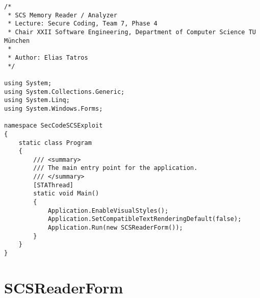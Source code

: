 \begin{lstlisting}
/* 
 * SCS Memory Reader / Analyzer
 * Lecture: Secure Coding, Team 7, Phase 4
 * Chair XXII Software Engineering, Department of Computer Science TU München
 *
 * Author: Elias Tatros
 */

using System;
using System.Collections.Generic;
using System.Linq;
using System.Windows.Forms;

namespace SecCodeSCSExploit
{
    static class Program
    {
        /// <summary>
        /// The main entry point for the application.
        /// </summary>
        [STAThread]
        static void Main()
        {
            Application.EnableVisualStyles();
            Application.SetCompatibleTextRenderingDefault(false);
            Application.Run(new SCSReaderForm());
        }
    }
}
\end{lstlisting}

\section{SCSReaderForm}

